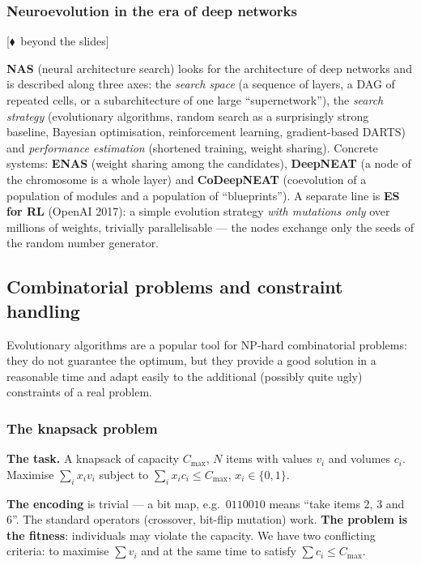 \documentclass[11pt,a4paper]{article}
\theoremstyle{definition}
\providecommand{\uv}[1]{``#1''}
\newcommand{\mimo}{\textcolor{markcol}{\textsf{\footnotesize[$\blacklozenge$~beyond the slides]}}}
\begin{document}
\subsubsection{Neuroevolution in the era of deep networks}

\noindent\mimo{}

\textbf{NAS} (neural architecture search) looks for the architecture of deep networks and is
described along three axes: the \emph{search space} (a sequence of layers, a DAG of repeated
cells, or a subarchitecture of one large \uv{supernetwork}), the \emph{search strategy}
(evolutionary algorithms, random search as a surprisingly strong baseline, Bayesian
optimisation, reinforcement learning, gradient-based DARTS) and \emph{performance estimation}
(shortened training, weight sharing). Concrete systems: \textbf{ENAS} (weight sharing among
the candidates), \textbf{DeepNEAT} (a node of the chromosome is a whole layer) and
\textbf{CoDeepNEAT} (coevolution of a population of modules and a population of
\uv{blueprints}). A separate line is \textbf{ES for RL} (OpenAI 2017): a simple evolution
strategy \emph{with mutations only} over millions of weights, trivially parallelisable ---
the nodes exchange only the seeds of the random number generator.

\subsection{Combinatorial problems and constraint handling}
\label{sec:kombi}

Evolutionary algorithms are a popular tool for NP-hard combinatorial problems:
they do not guarantee the optimum, but they provide a good solution in a
reasonable time and adapt easily to the additional (possibly quite ugly)
constraints of a real problem.

\subsubsection{The knapsack problem}

\textbf{The task.} A knapsack of capacity $C_{\max}$, $N$ items with values
$v_i$ and volumes $c_i$. Maximise $\sum_i x_i v_i$ subject to
$\sum_i x_i c_i \le C_{\max}$, $x_i \in \{0,1\}$.

\textbf{The encoding} is trivial --- a bit map, e.g.\ $0110010$ means
\uv{take items 2, 3 and 6}. The standard operators (crossover, bit-flip
mutation) work. \textbf{The problem is the fitness}: individuals may violate the
capacity. We have two conflicting criteria: to maximise $\sum v_i$ and at the
same time to satisfy $\sum c_i \le C_{\max}$.
\end{document}
